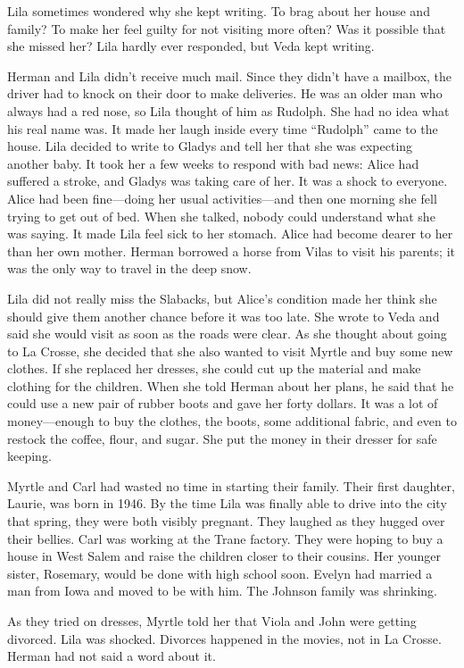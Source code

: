\documentclass[
  american,
  letterpaper,
]{book}
\begin{document}
Lila sometimes wondered why she kept writing. To brag about her house
and family? To make her feel guilty for not visiting more often? Was it
possible that she missed her? Lila hardly ever responded, but Veda kept
writing.

Herman and Lila didn't receive much mail. Since they didn't have a
mailbox, the driver had to knock on their door to make deliveries. He
was an older man who always had a red nose, so Lila thought of him as
Rudolph. She had no idea what his real name was. It made her laugh
inside every time ``Rudolph'' came to the house. Lila decided to write
to Gladys and tell her that she was expecting another baby. It took her
a few weeks to respond with bad news: Alice had suffered a stroke, and
Gladys was taking care of her. It was a shock to everyone. Alice had
been fine---doing her usual activities---and then one morning she fell
trying to get out of bed. When she talked, nobody could understand what
she was saying. It made Lila feel sick to her stomach. Alice had become
dearer to her than her own mother. Herman borrowed a horse from Vilas to
visit his parents; it was the only way to travel in the deep snow.

Lila did not really miss the Slabacks, but Alice's condition made her
think she should give them another chance before it was too late. She
wrote to Veda and said she would visit as soon as the roads were clear.
As she thought about going to La Crosse, she decided that she also
wanted to visit Myrtle and buy some new clothes. If she replaced her
dresses, she could cut up the material and make clothing for the
children. When she told Herman about her plans, he said that he could
use a new pair of rubber boots and gave her forty dollars. It was a lot
of money---enough to buy the clothes, the boots, some additional fabric,
and even to restock the coffee, flour, and sugar. She put the money in
their dresser for safe keeping.

Myrtle and Carl had wasted no time in starting their family. Their first
daughter, Laurie, was born in 1946. By the time Lila was finally able to
drive into the city that spring, they were both visibly pregnant. They
laughed as they hugged over their bellies. Carl was working at the Trane
factory. They were hoping to buy a house in West Salem and raise the
children closer to their cousins. Her younger sister, Rosemary, would be
done with high school soon. Evelyn had married a man from Iowa and moved
to be with him. The Johnson family was shrinking.

As they tried on dresses, Myrtle told her that Viola and John were
getting divorced. Lila was shocked. Divorces happened in the movies, not
in La Crosse. Herman had not said a word about it.
\end{document}
